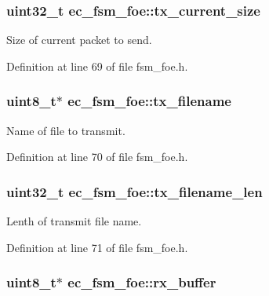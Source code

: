 \subsubsection[{tx\-\_\-current\-\_\-size}]{\setlength{\rightskip}{0pt plus 5cm}uint32\-\_\-t ec\-\_\-fsm\-\_\-foe\-::tx\-\_\-current\-\_\-size}\label{structec__fsm__foe_afca679da6083ed8c5dd4559941938527}


Size of current packet to send. 



Definition at line 69 of file fsm\-\_\-foe.\-h.

\subsubsection[{tx\-\_\-filename}]{\setlength{\rightskip}{0pt plus 5cm}uint8\-\_\-t$\ast$ ec\-\_\-fsm\-\_\-foe\-::tx\-\_\-filename}\label{structec__fsm__foe_a9861ec153889855a1fa74c1bada87865}


Name of file to transmit. 



Definition at line 70 of file fsm\-\_\-foe.\-h.

\subsubsection[{tx\-\_\-filename\-\_\-len}]{\setlength{\rightskip}{0pt plus 5cm}uint32\-\_\-t ec\-\_\-fsm\-\_\-foe\-::tx\-\_\-filename\-\_\-len}\label{structec__fsm__foe_a752483ab511b3c67efe4e1e111d6693f}


Lenth of transmit file name. 



Definition at line 71 of file fsm\-\_\-foe.\-h.

\subsubsection[{rx\-\_\-buffer}]{\setlength{\rightskip}{0pt plus 5cm}uint8\-\_\-t$\ast$ ec\-\_\-fsm\-\_\-foe\-::rx\-\_\-buffer}\label{structec__fsm__foe_a2141eab8b9b4821e6714c4873114d93e}


